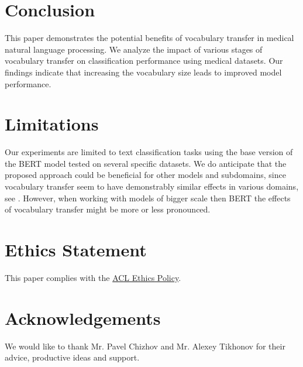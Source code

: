 \documentclass[11pt]{article}
\begin{document}

\section{Conclusion}


This paper demonstrates the potential benefits of vocabulary transfer in medical natural language processing. We analyze the impact of various stages of vocabulary transfer on classification performance using medical datasets. Our findings indicate that increasing the vocabulary size leads to improved model performance.

\section{Limitations}
Our experiments are limited to text classification tasks using the base version of the BERT model tested on several specific datasets. We do anticipate that the proposed approach could be beneficial for other models and subdomains, since vocabulary transfer seem to have demonstrably similar effects in various domains, see \cite{yamshchikov2022bert, alexandrov2024mitigating, gee2022fast}. However, when working with models of bigger scale then BERT the effects of vocabulary transfer might be more or less pronounced.

\section*{Ethics Statement}
This paper complies with the \href{https://www.aclweb.org/portal/content/acl-code-ethics}{ACL Ethics Policy}.

\section*{Acknowledgements}
We would like to thank Mr. Pavel Chizhov and Mr. Alexey Tikhonov for their advice, productive ideas and support.



\end{document}
